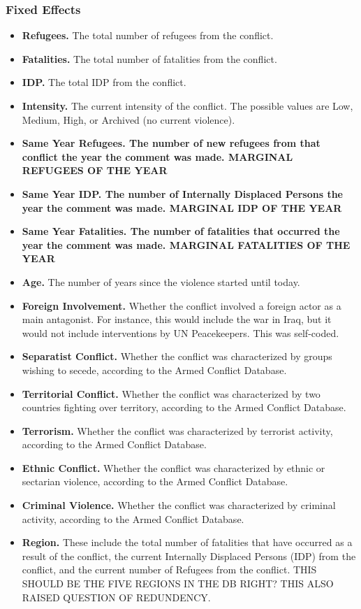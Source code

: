 \subsubsection{Fixed Effects}
\begin{itemize}
\item{\textbf{Refugees.} The total number of refugees from the conflict.}
\item{\textbf{Fatalities.} The total number of fatalities from the conflict.}
\item{\textbf{IDP.} The total IDP from the conflict.}
\item{\textbf{Intensity.} The current intensity of the conflict. The possible values are Low, Medium, High, or Archived (no current violence).}
\item{\textbf{Same Year Refugees. The number of new refugees from that conflict the year the comment was made. MARGINAL REFUGEES OF THE YEAR}} 
\item{\textbf{Same Year IDP. The number of Internally Displaced Persons the year the comment was made. MARGINAL IDP OF THE YEAR}}
\item{\textbf{Same Year Fatalities. The number of fatalities that occurred the year the comment was made. MARGINAL FATALITIES OF THE YEAR}}
\item{\textbf{Age.} The number of years since the violence started until today.}
\item{\textbf{Foreign Involvement.} Whether the conflict involved a foreign actor as a main antagonist. For instance, this would include the war in Iraq, but it would not include interventions by UN Peacekeepers. This was self-coded.}
\item{\textbf{Separatist Conflict.} Whether the conflict was characterized by groups wishing to secede, according to the Armed Conflict Database.}
\item{\textbf{Territorial Conflict.} Whether the conflict was characterized by two countries fighting over territory, according to the Armed Conflict Database.}
\item{\textbf{Terrorism.} Whether the conflict was characterized by terrorist activity, according to the Armed Conflict Database.}
\item{\textbf{Ethnic Conflict.} Whether the conflict was characterized by ethnic or sectarian violence, according to the Armed Conflict Database.}
\item{\textbf{Criminal Violence.} Whether the conflict was characterized by criminal activity, according to the Armed Conflict Database.}
\item{\textbf{Region.} These include the total number of fatalities that have occurred as a result of the conflict, the current Internally Displaced Persons (IDP) from the conflict, and the current number of Refugees from the conflict. THIS SHOULD BE THE FIVE REGIONS IN THE DB RIGHT? THIS ALSO RAISED QUESTION OF REDUNDENCY.}
\end{itemize} 

